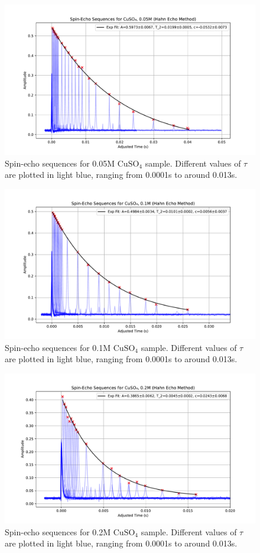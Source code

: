 \documentclass[12pt]{article}
\begin{document}
\begin{figure}[H]
  \includegraphics[scale = 0.5]{Spin_echo_0.05M.pdf}
  \caption{Spin-echo sequences for 0.05M $\text{CuSO}_4$ sample. Different values of $\tau$ are plotted in light blue, ranging from 0.0001s to around 0.013s. }
  \label{Spin_echo_0.05M.pdf}
\end{figure}
\begin{figure}[H]
  \includegraphics[scale = 0.5]{Spin_echo_0.1M.pdf}
  \caption{Spin-echo sequences for 0.1M $\text{CuSO}_4$ sample. Different values of $\tau$ are plotted in light blue, ranging from 0.0001s to around 0.013s. }
  \label{Spin_echo_0.1M.pdf}
\end{figure}
\begin{figure}[H]
  \includegraphics[scale = 0.5]{Spin_echo_0.2M.pdf}
  \caption{Spin-echo sequences for 0.2M $\text{CuSO}_4$ sample. Different values of $\tau$ are plotted in light blue, ranging from 0.0001s to around 0.013s. }
  \label{Spin_echo_0.2M.pdf}
\end{figure}
\end{document}
